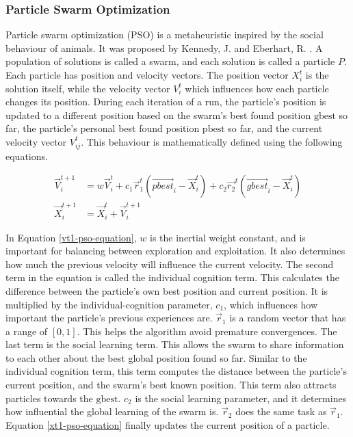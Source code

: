 \subsubsection{Particle Swarm Optimization}
\label{methods-section-pso}
Particle swarm optimization (PSO) is a metaheuristic inspired by the social behaviour of animals. It was proposed by Kennedy, J. and Eberhart, R. \cite{Kennedy1995}. A population of solutions is called a swarm, and each solution is called a particle $P$. Each particle has position and velocity vectors. The position vector $X_{i}^{t}$ is the solution itself, while the velocity vector $V_{i}^{t}$ which influences how each particle changes its position. During each iteration of a run, the particle's position is updated to a different position based on the swarm's best found position $\text{gbest}$ so far, the particle's personal best found position $\text{pbest}$ so far, and the current velocity vector $V_{ij}^{t}$. This behaviour is mathematically defined using the following equations.

\begin{align}
	\vec{V}_{i}^{t+1} &= w\vec{V}_{i}^{t} + c_{1}\vec{r}_{1}^{t} \left( \vec{pbest}_{i} - \vec{X}_{i}^{t} \right) + c_{2}\vec{r_{2}}^{t} \left( \vec{gbest}_{i} - \vec{X}_{i}^{t} \right) \label{vt1-pso-equation} \\
	\vec{X}_{i}^{t+1} &= \vec{X}_{i}^{t} + \vec{V}_{i}^{t+1} \label{xt1-pso-equation}
\end{align}

In Equation \ref{vt1-pso-equation}, $w$ is the inertial weight constant, and is important for balancing between exploration and exploitation. It also determines how much the previous velocity will influence the current velocity. The second term in the equation is called the individual cognition term. This calculates the difference between the particle's own best position and current position. It is multiplied by the individual-cognition parameter, $c_{1}$, which influences how important the particle's previous experiences are. $\vec{r}_{1}$ is a random vector that has a range of $[0, 1]$. This helps the algorithm avoid premature convergences. The last term is the social learning term. This allows the swarm to share information to each other about the best global position found so far. Similar to the individual cognition term, this term computes the distance between the particle's current position, and the swarm's best known position. This term also attracts particles towards the $\text{gbest}$. $c_{2}$ is the social learning parameter, and it determines how influential the global learning of the swarm is. $\vec{r}_{2}$ does the same task as $\vec{r}_{1}$. Equation \ref{xt1-pso-equation} finally updates the current position of a particle.


